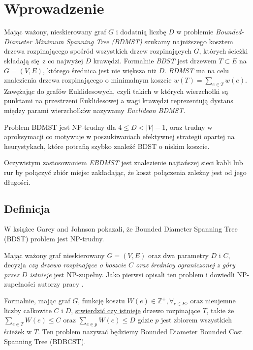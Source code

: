 \section{Wprowadzenie}
Mając ważony, nieskierowany graf $G$ i dodatnią liczbę $D$ w problemie \textit{Bounded-Diameter Minimum Spanning Tree (BDMST)} szukamy najniższego kosztem drzewa rozpinającego spośród wszystkich drzew rozpinających $G$, których ścieżki składają się z co najwyżej $D$ krawędzi. Formalnie \textit{BDST} jest drzewem $T \subset E$ na $G = (V, E)$, którego średnica jest nie większa niż $D$. \textit{BDMST} ma na celu znalezienia drzewa rozpinającego o minimalnym koszcie $w(T) = \sum_{e\in T} w(e)$. Zawężając do grafów Euklidesowych, czyli takich w których wierzchołki są punktami na przestrzeni Euklidesowej a wagi krawędzi reprezentują dystans między parami wierzchołków nazywamy \textit{Euclidean BDMST}.

Problem BDMST jest NP-trudny dla $4 \leq D < |V| - 1$, oraz trudny w aproksymacji co motywuje w poszukiwaniach efektywnej strategii opartej na heurystykach, które potrafią szybko znaleźć BDST o niskim koszcie.

Oczywistym zastosowaniem \textit{EBDMST} jest znalezienie najtańszej sieci kabli lub rur by połączyć zbiór miejsc zakładając, że koszt połączenia zależny jest od jego długości.


\subsection{Definicja}
W książce \cite[p.~206]{10.5555/574848} Garey and Johnson pokazali, że Bounded Diameter Spanning Tree (BDST) problem jest NP-trudny.

Mając ważony graf nieskierowany $G = (V, E)$ oraz dwa parametry $D$ i $C$, decyzja \textit{czy drzewo rozpinające o koszcie $C$ oraz średnicy ograniczonej z góry przez $D$ istnieje} jest NP-zupełny. Jako pierwsi opisali ten problem i dowiedli NP-zupełności autorzy pracy \cite{DBLP:conf/compgeom/HoL89}.

Formalnie, mając graf $G$, funkcję kosztu $W(e) \in \mathbb{Z}^+, \forall_{e\in E}$, oraz nieujemne liczby całkowite $C$ i $D$, \underline{stwierdzić czy istnieje} drzewo rozpinające $T$, takie że $\sum_{e\in T} W(e) \leq C$ oraz $\sum_{e\in p} W(e) \leq D$ gdzie $p$ jest zbiorem wszystkich ścieżek w $T$. Ten problem nazywać będziemy Bounded Diameter Bounded Cost Spanning Tree (BDBCST).

